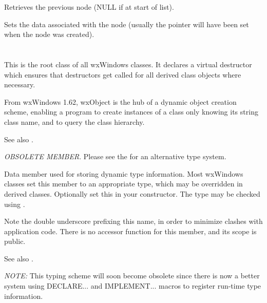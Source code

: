 

Retrieves the previous node (NULL if at start of list).



Sets the data associated with the node (usually the pointer will have been
set when the node was created).

\section{}\label{wxobject}

This is the root class of all wxWindows classes.
It declares a virtual destructor which ensures that
destructors get called for all derived class objects where necessary.

From wxWindows 1.62, wxObject is the hub of a dynamic object creation
scheme, enabling a program to create instances of a class only knowing
its string class name, and to query the class hierarchy.

See also .

\label{objecttype}


{\it OBSOLETE MEMBER}. Please see the \rtfsp
for an alternative type system.

Data member used for storing dynamic type information. Most wxWindows
classes set this member to an appropriate type, which may be overridden
in derived classes. Optionally set this in your constructor. The type
may be checked using .

Note the double underscore prefixing this name, in order to minimize clashes
with application code. There is no accessor function for this member, and
its scope is public.

See also .

{\it NOTE:} This typing scheme will soon become obsolete since there is now
a better system using DECLARE... and IMPLEMENT... macros to register run-time
type information.



